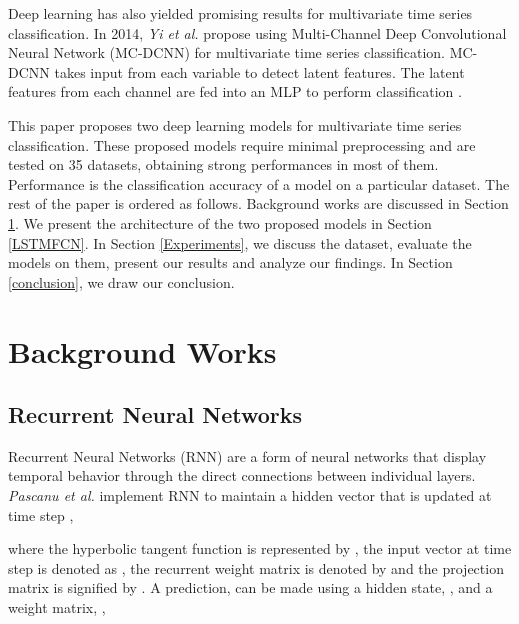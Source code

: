 \documentclass[preprint,12pt,3p]{elsarticle}
\begin{document}
Deep learning has also yielded promising results for multivariate time series classification. In 2014, \textit{Yi et al.} propose using Multi-Channel Deep Convolutional Neural Network (MC-DCNN) for multivariate time series classification. MC-DCNN takes input from each variable to detect latent features. The latent features from each channel are fed into an MLP to perform classification \cite{zheng2014time}. 

This paper proposes two deep learning models for multivariate time series classification. These proposed models require minimal preprocessing and are tested on 35 datasets, obtaining strong performances in most of them. Performance is the classification accuracy of a model on a particular dataset. The rest of the paper is ordered as follows. Background works are discussed in Section \ref{Background Works}. We present the architecture of the two proposed models in Section \ref{LSTMFCN}. In Section \ref{Experiments}, we discuss the dataset, evaluate the models on them, present our results and analyze our findings. In Section \ref{conclusion}, we draw our conclusion. 





 















\section{Background Works}
\label{Background Works}
\subsection{Recurrent Neural Networks}
\def\x{{\mathbf x}}
\def\L{{\cal L}}

Recurrent Neural Networks (RNN) are a form of neural networks that display temporal behavior through the direct connections between individual layers.  \textit{Pascanu et al.} \cite{pascanu2013construct} implement RNN to maintain a hidden vector  that is updated at time step ,

where the hyperbolic tangent function is represented by , the input vector at time step  is denoted as , the recurrent weight matrix is denoted by  and the projection matrix is signified by . A prediction,  can be made using a hidden state,  , and a weight matrix, ,
\end{document}
